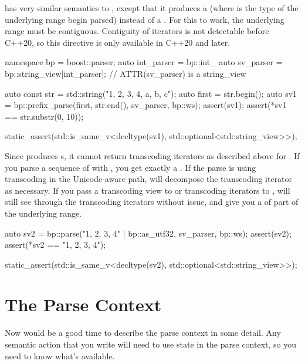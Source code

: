 \documentclass{MyBook}
\begin{document}
 has very similar semantics to , except that it produces a  (where  is the type of the underlying range begin parsed) instead of a . For this to work, the underlying range must be contiguous. Contiguity of iterators is not detectable before C++20, so this directive is only available in C++20 and later.

\begin{code}
namespace bp = boost::parser;
auto int_parser = bp::int_ %
auto sv_parser = bp::string_view[int_parser];  // ATTR(sv_parser) is a string_view

auto const str = std::string("1, 2, 3, 4, a, b, c");
auto first = str.begin();
auto sv1 = bp::prefix_parse(first, str.end(), sv_parser, bp::ws);
assert(sv1);
assert(*sv1 == str.substr(0, 10));

static_assert(std::is_same_v<decltype(sv1), std::optional<std::string_view>>);
\end{code}

Since  produces s, it cannot return transcoding iterators as described above for . If you parse a sequence of  with , you get exactly a . If the parse is using transcoding in the Unicode-aware path,  will decompose the transcoding iterator as necessary. If you pass a transcoding view to  or transcoding iterators to ,  will still see through the transcoding iterators without issue, and give you a  of part of the underlying range.

\begin{code}
auto sv2 = bp::parse("1, 2, 3, 4" | bp::as_utf32, sv_parser, bp::ws);
assert(sv2);
assert(*sv2 == "1, 2, 3, 4");

static_assert(std::is_same_v<decltype(sv2), std::optional<std::string_view>>);
\end{code}

\section{The Parse Context}

Now would be a good time to describe the parse context in some detail. Any semantic action that you write will need to use state in the parse context, so you need to know what's available.
\end{document}
